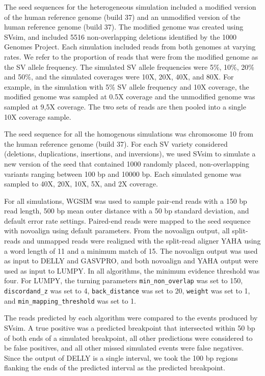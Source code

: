 \documentclass[10pt]{bmc_article}
\newenvironment{bmcformat}{\begin{raggedright}\baselineskip20pt\sloppy\setboolean{publ}{false}}{\end{raggedright}\baselineskip20pt\sloppy}
\begin{document}
\begin{bmcformat}
The seed sequences for the heterogeneous simulation included a modified version
of the human reference genome (build 37) and an unmodified version of the human
reference genome (build 37).  The modified genome was created using SVsim, and
included 5516 non-overlapping deletions identified by the 1000 Genomes Project.
Each simulation included reads from both genomes at varying rates.  We refer to
the proportion of reads that were from the modified genome as the SV allele
frequency.  The simulated SV allele frequencies were 5\%, 10\%, 20\% and 50\%,
and the simulated coverages were 10X, 20X, 40X, and 80X.  For example, in the
simulation with 5\% SV allele frequency and 10X coverage, the modified genome
was sampled at 0.5X coverage and the unmodified genome was sampled at 9,5X
coverage.  The two sets of reads are then pooled into a single 10X coverage
sample.

The seed sequence for all the homogenous simulations was chromosome 10 from the
human reference genome (build 37). For each SV variety considered (deletions,
duplications, insertions, and inversions), we used SVsim to simulate a new
version of the seed that contained 1000 randomly placed, non-overlapping
variants ranging between 100 bp and 10000 bp. Each simulated genome was sampled
to 40X, 20X, 10X, 5X, and 2X coverage.

For all simulations, WGSIM was used to sample pair-end reads with a 150 bp read
length, 500 bp mean outer distance with a 50 bp standard deviation, and default
error rate settings.  Paired-end reads were mapped to the seed sequence with
novoalign using default parameters. From the novoalign output, all split-reads
and unmapped reads were realigned with the split-read aligner YAHA using a word
length of 11 and a minimum match of 15. The novoalign output was used as input
to DELLY and GASVPRO, and both novoalign and YAHA output were used as input to
LUMPY. In all algorithms, the minimum evidence threshold was four. For LUMPY,
the turning parameters {\tt min\_non\_overlap} was set to 150, 
{\tt discordand\_z} was set to 4, {\tt back\_distance} was set to 20, 
{\tt weight} was set to 1, and {\tt min\_mapping\_threshold} was set to 1.

The reads predicted by each algorithm were compared to the events produced by
SVsim. A true positive was a predicted breakpoint that intersected within 50 bp
of both ends of a simulated breakpoint, all other predictions were considered to
be false positives, and all other missed simulated events were false negatives.
Since the output of DELLY is a single interval, we took the 100 bp regions
flanking the ends of the predicted interval as the predicted breakpoint.


\end{bmcformat}
\end{document}
